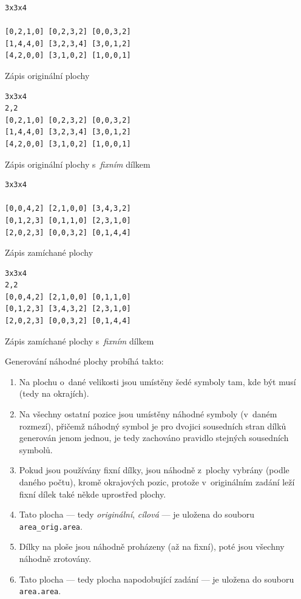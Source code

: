 \documentclass[11pt, titlepage]{report}
\begin{document}
\clearpage

\begin{output}
\begin{verbatim}
3x3x4

[0,2,1,0] [0,2,3,2] [0,0,3,2] 
[1,4,4,0] [3,2,3,4] [3,0,1,2] 
[4,2,0,0] [3,1,0,2] [1,0,0,1] 
\end{verbatim}
\caption{Zápis originální plochy}
\label{output-3x3x4}
\end{output}

\begin{output}
\begin{verbatim}
3x3x4
2,2
[0,2,1,0] [0,2,3,2] [0,0,3,2] 
[1,4,4,0] [3,2,3,4] [3,0,1,2] 
[4,2,0,0] [3,1,0,2] [1,0,0,1] 
\end{verbatim}
\caption{Zápis originální plochy s~\emph{fixním} dílkem}
\label{output-3x3x4-1f}
\end{output}

\begin{output}
\begin{verbatim}
3x3x4

[0,0,4,2] [2,1,0,0] [3,4,3,2] 
[0,1,2,3] [0,1,1,0] [2,3,1,0] 
[2,0,2,3] [0,0,3,2] [0,1,4,4] 
\end{verbatim}
\caption{Zápis zamíchané plochy}
\label{output-3x3x4-rand}
\end{output}

\begin{output}
\begin{verbatim}
3x3x4
2,2
[0,0,4,2] [2,1,0,0] [0,1,1,0] 
[0,1,2,3] [3,4,3,2] [2,3,1,0] 
[2,0,2,3] [0,0,3,2] [0,1,4,4] 
\end{verbatim}
\caption{Zápis zamíchané plochy s~\emph{fixním} dílkem}
\label{output-3x3x4-1f-rand}
\end{output}

Generování náhodné plochy probíhá takto:

\begin{enumerate}
\item Na plochu o~dané velikosti jsou umístěny šedé symboly tam, kde být musí (tedy na okrajích).
\item Na všechny ostatní pozice jsou umístěny náhodné symboly (v~daném rozmezí), přičemž náhodný symbol je pro dvojici sousedních stran dílků generován jenom jednou, je tedy zachováno pravidlo stejných sousedních symbolů.
\item Pokud jsou používány fixní dílky, jsou náhodně z~plochy vybrány (podle daného počtu), kromě okrajových pozic, protože v~originálním zadání leží fixní dílek také někde uprostřed plochy.
\item Tato plocha --- tedy \emph{originální}, \emph{cílová} --- je uložena do souboru \texttt{area\_orig.area}.
\item Dílky na ploše jsou náhodně proházeny (až na fixní), poté jsou všechny náhodně zrotovány.
\item Tato plocha --- tedy plocha napodobující zadání --- je uložena do souboru \texttt{area.area}.
\end{enumerate}
\end{document}
